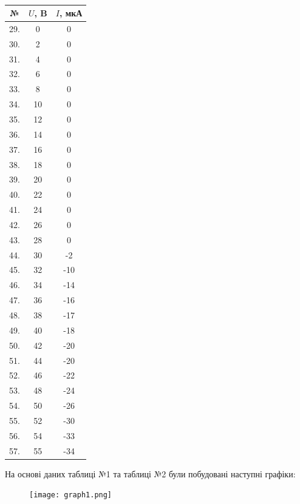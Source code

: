 \documentclass[12pt,a4paper]{article}
\begin{document}
    \hfill
    \begin{minipage}[t]{0.48\textwidth}
    \\[2em]

    \vspace{0.5em}
    \begin{tabular}{|c|c|c|}
    \hline
    № & $U$, B & $I$, мкА \\
    \hline
    29. & 0 & 0 \\
    30. & 2 & 0 \\
    31. & 4 & 0 \\
    32. & 6 & 0 \\
    33. & 8 & 0 \\
    34. & 10 & 0 \\
    35. & 12 & 0 \\
    36. & 14 & 0 \\
    37. & 16 & 0 \\
    38. & 18 & 0 \\
    39. & 20 & 0 \\
    40. & 22 & 0 \\
    41. & 24 & 0 \\
    42. & 26 & 0 \\
    43. & 28 & 0 \\
    44. & 30 & -2 \\
    45. & 32 & -10 \\
    46. & 34 & -14 \\
    47. & 36 & -16 \\
    48. & 38 & -17 \\
    49. & 40 & -18 \\
    50. & 42 & -20 \\
    51. & 44 & -20 \\
    52. & 46 & -22 \\
    53. & 48 & -24 \\
    54. & 50 & -26 \\
    55. & 52 & -30 \\
    56. & 54 & -33 \\
    57. & 55 & -34 \\
    \hline
    \end{tabular}
    \end{minipage}

    \newpage

    На основі даних таблиці №1 та таблиці №2 були побудовані наступні графіки:

    \begin{figure}[ht]
        \texttt{[image: graph1.png]}
    \end{figure}
\end{document}
